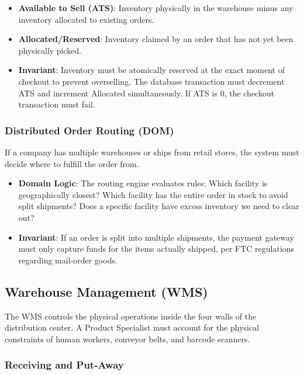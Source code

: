 \begin{itemize}
\tightlist
\item
  \textbf{Available to Sell (ATS)}: Inventory physically in the
  warehouse minus any inventory allocated to existing orders.
\item
  \textbf{Allocated/Reserved}: Inventory claimed by an order that has
  not yet been physically picked.
\item
  \textbf{Invariant}: Inventory must be atomically reserved at the exact
  moment of checkout to prevent overselling. The database transaction
  must decrement ATS and increment Allocated simultaneously. If ATS is
  0, the checkout transaction must fail.
\end{itemize}

\subsubsection{Distributed Order Routing
(DOM)}\label{distributed-order-routing-dom}

If a company has multiple warehouses or ships from retail stores, the
system must decide where to fulfill the order from.

\begin{itemize}
\tightlist
\item
  \textbf{Domain Logic}: The routing engine evaluates rules: Which
  facility is geographically closest? Which facility has the entire
  order in stock to avoid split shipments? Does a specific facility have
  excess inventory we need to clear out?
\item
  \textbf{Invariant}: If an order is split into multiple shipments, the
  payment gateway must only capture funds for the items actually
  shipped, per FTC regulations regarding mail-order goods.
\end{itemize}

\subsection{Warehouse Management (WMS)}\label{warehouse-management-wms}

The WMS controls the physical operations inside the four walls of the
distribution center. A Product Specialist must account for the physical
constraints of human workers, conveyor belts, and barcode scanners.

\subsubsection{Receiving and Put-Away}\label{receiving-and-put-away}


